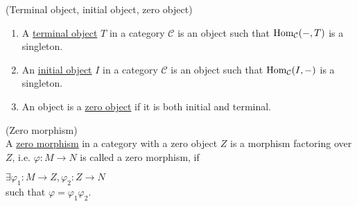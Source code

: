 \begin{definition}{(Terminal object, initial object, zero object)}\label{def:init_term_zero_object}
\renewcommand{\labelenumi}{(\theenumi)}
\begin{enumerate}
\item A \ul{terminal object} $T$ in a category $\mathcal{C}$ is an object such that $\textup{Hom}_{\mathcal{C}}(-,T)$ is a singleton.
\item An \ul{initial object} $I$ in a category $\mathcal{C}$ is an object such that $\textup{Hom}_{\mathcal{C}}(I,-)$ is a singleton.
\item An object is a \ul{zero object} if it is both initial and terminal.
\end{enumerate}
\end{definition}

\begin{definition}{(Zero morphism)}\label{def:zero_morphism}\\
A \ul{zero morphism} in a category with a zero object $Z$ is a morphism factoring over $Z$, i.e. $\varphi : M \rightarrow N$ is called a zero
morphism, if\\
\begin{minipage}{.35\textwidth}
\end{minipage}
\begin{minipage}{.65\textwidth}
$\exists \varphi_{1} : M \rightarrow Z, \varphi_{2} : Z \rightarrow N$\\
such that $\varphi = \varphi_{1}\varphi_{2}$.
\end{minipage}
\end{definition}



